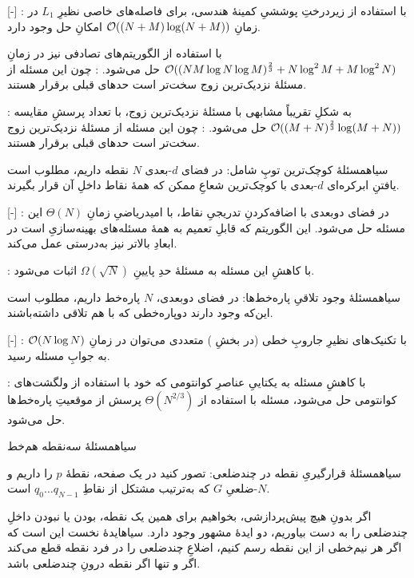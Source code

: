 [-]
: با استفاده از زیردرختِ پوششیِ کمینهٔ هندسی، برای فاصله‌های خاصی نظیرِ $L_1$ در زمانِ 
$\mathcal{O}((N+M) \log (N+M))$
 امکانِ حل وجود دارد.

با استفاده از الگوریتم‌های تصادفی نیز در زمانِ
$\mathcal{O}((NM \log N\log M)^\frac{2}{3}+N\log^2M+M\log^2N)$
حل می‌شود.
: چون این مسئله از مسئلهٔ نزدیک‌ترین زوج سخت‌تر است حدهای قبلی برقرار هستند.

: به شکلِ تقریباً مشابهی با مسئلهٔ نزدیک‌ترین زوج، با تعداد پرسشِ مقایسه
$\mathcal{O}((M+N)^{\frac{2}{3}} \log (M+N))$
حل می‌شود.
: چون این مسئله از مسئلهٔ نزدیک‌ترین زوج سخت‌تر است حدهای قبلی برقرار هستند.


‌سیاه{مسئلهٔ کوچک‌ترین توپِ شامل}: در فضای $d$-بعدی $N$ نقطه داریم، مطلوب است یافتنِ ابرکره‌ای $d$-بعدی با کوچک‌ترین شعاعِ ممکن که همهٔ نقاط داخلِ آن قرار بگیرند.

[-]
: در فضای دوبعدی با اضافه‌کردنِ تدریجیِ نقاط، با امیدریاضیِ زمانِ
$\Theta(N)$
این مسئله حل می‌شود. این الگوریتم که قابلِ تعمیم به همهٔ مسئله‌های بهینه‌سازیِ 
است در ابعادِ بالاتر نیز به‌درستی عمل می‌کند.

: با کاهشِ این مسئله به مسئلهٔ 
حدِ پایینِ
$\Omega(\sqrt{N})$
اثبات می‌شود.


‌سیاه{مسئلهٔ وجود تلاقیِ پاره‌خط‌ها}: در فضای دوبعدی، $N$ پاره‌خط داریم، مطلوب است این‌که وجود دارند دوپاره‌خطی که با هم تلاقی داشته‌باشند.

[-]
: با تکنیک‌های نظیرِ جاروبِ خطی (در بخشِ ) متعددی می‌توان در زمانِ 
$\mathcal{O}(N\log N)$
به جوابِ مسئله رسید.

: با کاهشِ مسئله به یکتاییِ عناصرِ کوانتومی که خود با استفاده از ولگشت‌های کوانتومی حل می‌شود، مسئله با استفاده از
$\Theta(N^{2/3})$
پرسش از موقعیتِ پاره‌خط‌ها حل می‌شود.


‌سیاه{مسئلهٔ سه‌نقطه هم‌خط} 


‌سیاه{مسئلهٔ قرارگیریِ نقطه در چندضلعی}: تصور کنید در یک صفحه، نقطهٔ 
\(p\)
را داریم و \(N\)-ضلعیِ 
\(G\)
که به‌ترتیب مشتکل از نقاطِ 
\(q_0 \dots q_{N-1}\)
است.

اگر بدونِ هیچ پیش‌پردازشی، بخواهیم برای همین یک نقطه، بودن یا نبودن داخلِ چندضلعی را به دست بیاوریم، دو ایدهٔ مشهور وجود دارد.
‌سیاه{ایدهٔ نخست} این است که اگر هر نیم‌خطی از این نقطه رسم کنیم، اضلاعِ چندضلعی را در فرد نقطه قطع می‌کند اگر و تنها اگر نقطه درونِ چندضلعی باشد.

